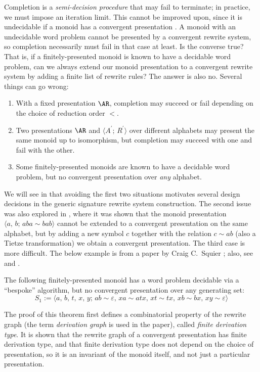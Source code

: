\documentclass[../generics]{subfiles}
\begin{document}
Completion is a \emph{semi-decision procedure} that may fail to terminate; in practice, we must impose an iteration limit. This cannot be improved upon, since it is undecidable if a monoid has a convergent presentation \cite{ODUNLAING1983339}. A monoid with an undecidable word problem cannot be presented by a convergent rewrite system, so completion necessarily must fail in that case at least. Is the converse true? That is, if a finitely-presented monoid is known to have a decidable word problem, can we always extend our monoid presentation to a convergent rewrite system by adding a finite list of rewrite rules? The answer is also no. Several things can go wrong:
\begin{enumerate}
\item With a fixed presentation $\AR$, completion may succeed or fail depending on the choice of reduction order $<$.
\item Two presentations $\AR$ and $\langle A^\prime;\,R^\prime\rangle$ over different alphabets may present the same monoid up to isomorphism, but completion may succeed with one and fail with the other.
\item Some finitely-presented monoids are known to have a decidable word problem, but no convergent presentation over \emph{any} alphabet.
\end{enumerate}
We will see in  that avoiding the first two situations motivates several design decisions in the generic signature rewrite system construction. The second issue was also explored in \cite{KAPUR1985337}, where it was shown that the monoid presentation $\langle a,\,b;\,aba\sim bab\rangle$ cannot be extended to a convergent presentation on the same alphabet, but by adding a new symbol $c$ together with the relation $c\sim ab$ (also a Tietze transformation) we obtain a convergent presentation. The third case is more difficult. The below example is from a paper by Craig C.~Squier \cite{SQUIER1994271}; also, see \cite{Lafont1991ChurchRooserPA} and \cite{LAFONT1995229}.
\begin{theorem}\label{squier s1} The following finitely-presented monoid has a word problem decidable via a ``bespoke'' algorithm, but no convergent presentation over any generating set:
\[S_1:=\langle a,\,b,\,t,\,x,\,y;\,ab\sim \varepsilon,\,xa\sim atx,\,xt\sim tx,\,xb\sim bx,\,xy\sim \varepsilon\rangle\]
\end{theorem}
The proof of this theorem first defines a combinatorial property of the rewrite graph (the term \emph{derivation graph} is used in the paper), called \emph{finite derivation type}. It is shown that the rewrite graph of a convergent presentation has finite derivation type, and that finite derivation type does not depend on the choice of presentation, so it is an invariant of the monoid itself, and not just a particular presentation.
\end{document}
